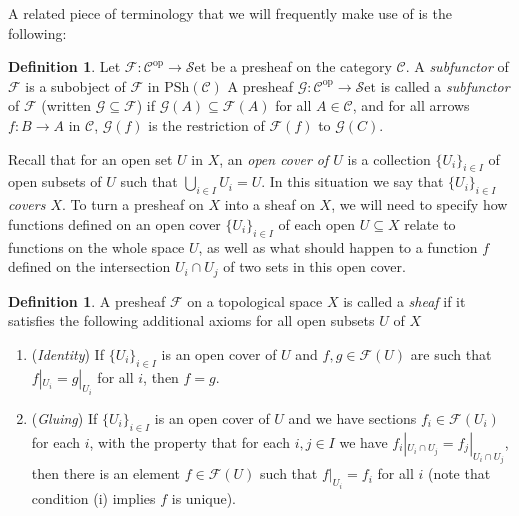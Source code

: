 \documentclass[10pt,oneside]{book}
\def\~#1{\mathscr{#1}}
\newcommand{\op}{\mathrm{op}}
\newcommand{\PSh}{\mathrm{PSh}}
\newcommand{\Set}{\~S\mathrm{et}}
\theoremstyle{plain}
\theoremstyle{definition}
\newtheorem{defn}[thm]{Definition}
\theoremstyle{remark}
\numberwithin{equation}{section}
\numberwithin{figure}{section}
\begin{document}
A related piece of terminology that we will frequently make use of is the following:
\begin{defn}
    Let $\~F: \~C^\op \to \Set$ be a presheaf on the category $\~C$. A \emph{subfunctor} of $\~F$ is a subobject of $\~F$ in $\PSh(\~C)$ A presheaf $\~G: \~C^\op \to \Set$ is called a \emph{subfunctor} of $\~F$ (written $\~G \subseteq \~F$) if $\~G(A) \subseteq \~F(A)$ for all $A \in \~C$, and for all arrows $f: B \to A$ in $\~C$, $\~G(f)$ is the restriction of $\~F(f)$ to $\~G(C)$.
\end{defn}

Recall that for an open set $U$ in $X$, an \emph{open cover of $U$} is a collection $\{U_i\}_{i \in I}$ of open subsets of $U$ such that $ \bigcup_{i \in I} U_i = U$. In this situation we say that $\{U_i\}_{i \in I}$ \emph{covers $X$}. To turn a presheaf on $X$ into a sheaf on $X$, we will need to specify how functions defined on an open cover $\{U_i\}_{i \in I}$ of each open $U \subseteq X$ relate to functions on the whole space $U$, as well as what should happen to a function $f$ defined on the intersection $U_i \cap U_j$ of two sets in this open cover. 
\begin{defn}\label{defn:sheaf}
A presheaf $\~F$ on a topological space $X$ is called a \emph{sheaf} if it satisfies the following additional axioms for all 
open subsets $U$ of $X$
\begin{enumerate}[label=(\roman*)]
        \item\label{sheaf:identity} (\emph{Identity}) If $\{U_i\}_{i \in I}$ is an open cover of $U$ and $f, g \in \~F(U)$ are such that $f|_{U_i}= g|_{U_i}$ for all $i$, then $f = g$.
        \item\label{sheaf:gluing} (\emph{Gluing}) If $\{U_i\}_{i \in I}$ is an open cover of $U$ and we have sections $f_i \in \~F(U_i)$ for each $i$, with the property that for each $i, j \in I$ we have $f_i|_{U_i \cap U_j} = f_j|_{U_i \cap U_j}$, then there is an element $f \in \~F(U)$ such that $f|_{U_i} = f_i$ for all $i$ (note that condition (i) implies $f$ is unique).
\end{enumerate}
\end{defn}
\end{document}
